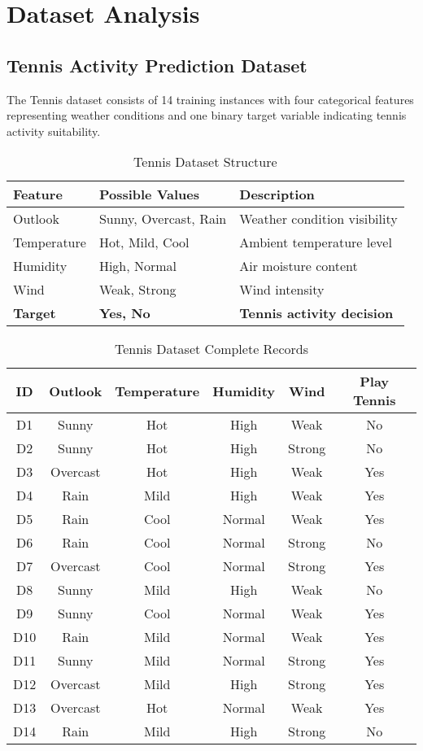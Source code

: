 \documentclass[11pt,a4paper]{article}
\begin{document}
\section{Dataset Analysis}

\subsection{Tennis Activity Prediction Dataset}

The Tennis dataset consists of 14 training instances with four categorical features representing weather conditions and one binary target variable indicating tennis activity suitability.

\begin{table}[H]
\centering
\caption{Tennis Dataset Structure}
\begin{tabular}{|l|l|l|}
\hline
\textbf{Feature} & \textbf{Possible Values} & \textbf{Description} \\
\hline
Outlook & Sunny, Overcast, Rain & Weather condition visibility \\
Temperature & Hot, Mild, Cool & Ambient temperature level \\
Humidity & High, Normal & Air moisture content \\
Wind & Weak, Strong & Wind intensity \\
\textbf{Target} & \textbf{Yes, No} & \textbf{Tennis activity decision} \\
\hline
\end{tabular}
\end{table}

\begin{table}[H]
\centering
\caption{Tennis Dataset Complete Records}
\begin{tabular}{|c|c|c|c|c|c|}
\hline
\textbf{ID} & \textbf{Outlook} & \textbf{Temperature} & \textbf{Humidity} & \textbf{Wind} & \textbf{Play Tennis} \\
\hline
D1 & Sunny & Hot & High & Weak & No \\
D2 & Sunny & Hot & High & Strong & No \\
D3 & Overcast & Hot & High & Weak & Yes \\
D4 & Rain & Mild & High & Weak & Yes \\
D5 & Rain & Cool & Normal & Weak & Yes \\
D6 & Rain & Cool & Normal & Strong & No \\
D7 & Overcast & Cool & Normal & Strong & Yes \\
D8 & Sunny & Mild & High & Weak & No \\
D9 & Sunny & Cool & Normal & Weak & Yes \\
D10 & Rain & Mild & Normal & Weak & Yes \\
D11 & Sunny & Mild & Normal & Strong & Yes \\
D12 & Overcast & Mild & High & Strong & Yes \\
D13 & Overcast & Hot & Normal & Weak & Yes \\
D14 & Rain & Mild & High & Strong & No \\
\hline
\end{tabular}
\end{table}
\end{document}
